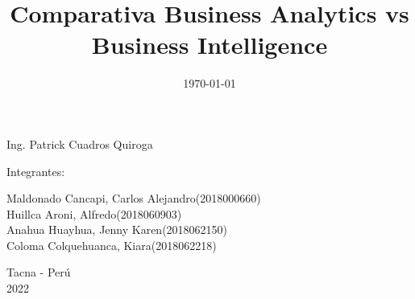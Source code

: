 \documentclass[twoside,twocolumn]{article}
\begin{document}
\begin{titlepage}
\begin{center}
\vspace*{0.1in}
\begin{large}
 Ing. Patrick Cuadros Quiroga\\
\end{large}

\vspace*{0.2in}
\vspace*{0.1in}
\begin{large}

Integrantes: \\
\begin{flushleft}
Maldonado Cancapi, Carlos Alejandro\hfill(2018000660) \\
Huillca Aroni, Alfredo\hfill(2018060903)\\
Anahua Huayhua, Jenny Karen\hfill(2018062150)\\
Coloma Colquehuanca, Kiara\hfill(2018062218)\\

\end{flushleft}
\end{large}

\vspace*{0.1in}
\begin{large}
Tacna - Perú\\
2022
\end{large}
\end{center}
\end{titlepage}

\setlength{\droptitle}{-4\baselineskip} %

\pretitle{\begin{center}\Huge\bfseries} %
\posttitle{\end{center}} %
\title{Comparativa Business Analytics vs Business Intelligence} %

\date{\today} %
\renewcommand{\maketitlehookd}{%

}




\maketitle

\end{document}
